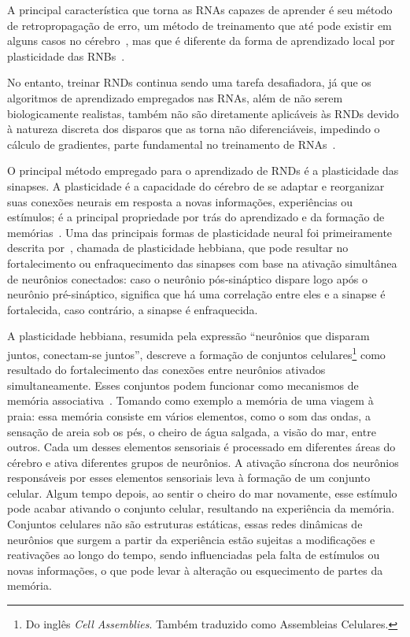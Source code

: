 A principal característica que torna as RNAs capazes de aprender é seu método de retropropagação de erro, um método de treinamento
que até pode existir em alguns casos no cérebro~\cite{lillicrapBackpropagation2020,songCan2020}, mas que é diferente da forma de
aprendizado local por plasticidade das RNBs~\cite{yamazakiSpiking2022}.

No entanto, treinar RNDs continua sendo uma tarefa desafiadora, já que os algoritmos de aprendizado empregados nas RNAs, além de
não serem biologicamente realistas, também não são diretamente aplicáveis às RNDs devido à natureza discreta dos disparos que as
torna não diferenciáveis, impedindo o cálculo de gradientes, parte fundamental no treinamento de RNAs~\cite{}.

O principal método empregado para o aprendizado de RNDs é a plasticidade das sinapses. A plasticidade é a capacidade do cérebro de
se adaptar e reorganizar suas conexões neurais em resposta a novas informações, experiências ou estímulos; é a principal
propriedade por trás do aprendizado e da formação de memórias~\cite{}. Uma das principais formas de plasticidade neural foi
primeiramente descrita por~\cite{hebbOrganization1949}, chamada de plasticidade hebbiana, que pode resultar no fortalecimento ou
enfraquecimento das sinapses com base na ativação simultânea de neurônios conectados: caso o neurônio pós-sináptico dispare logo
após o neurônio pré-sináptico, significa que há uma correlação entre eles e a sinapse é fortalecida, caso contrário, a sinapse é
enfraquecida.

A plasticidade hebbiana, resumida pela expressão ``neurônios que disparam juntos, conectam-se juntos'', descreve a formação de
conjuntos celulares\footnote{Do inglês \textit{Cell Assemblies}. Também traduzido como Assembleias Celulares.} como resultado do
fortalecimento das conexões entre neurônios ativados simultaneamente. Esses conjuntos podem funcionar como mecanismos de memória
associativa~\cite{sakuraiMultiple2018}. Tomando como exemplo a memória de uma viagem à praia: essa memória consiste em vários
elementos, como o som das ondas, a sensação de areia sob os pés, o cheiro de água salgada, a visão do mar, entre outros. Cada um
desses elementos sensoriais é processado em diferentes áreas do cérebro e ativa diferentes grupos de neurônios. A ativação
síncrona dos neurônios responsáveis por esses elementos sensoriais leva à formação de um conjunto celular. Algum tempo depois, ao
sentir o cheiro do mar novamente, esse estímulo pode acabar ativando o conjunto celular, resultando na experiência da memória.
Conjuntos celulares não são estruturas estáticas, essas redes dinâmicas de neurônios que surgem a partir da experiência estão
sujeitas a modificações e reativações ao longo do tempo, sendo influenciadas pela falta de estímulos ou novas informações, o que
pode levar à alteração ou esquecimento de partes da memória.

